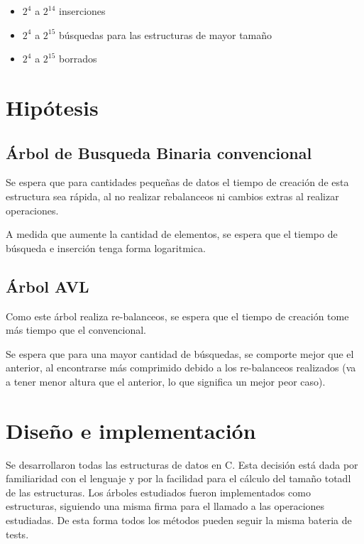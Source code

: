 \documentclass[12pt,letterpaper,hidelinks]{extarticle}
\begin{document}
	\begin{itemize}
			\item $2^{4}$ a $2^{14}$ inserciones
			\item $2^{4}$ a $2^{15}$ búsquedas para las estructuras de mayor tamaño
			\item $2^{4}$ a $2^{15}$ borrados
	\end{itemize}

\newpage
\section{Hipótesis}

	\subsection{Árbol de Busqueda Binaria convencional}
		Se espera que para cantidades pequeñas de datos el tiempo de creación de esta estructura
		sea rápida, al no realizar rebalanceos ni cambios extras al realizar operaciones.

		A medida que aumente la cantidad de elementos, se espera que el tiempo de búsqueda e inserción
		tenga forma logaritmica.

	\subsection{Árbol AVL}
		Como este árbol realiza re-balanceos, se espera que el tiempo de creación tome más tiempo que el
		convencional.

		Se espera que para una mayor cantidad de búsquedas, se comporte mejor que el anterior, al encontrarse más comprimido
		 debido a los re-balanceos realizados (va a tener menor altura que el anterior, lo que significa un mejor peor caso).




\section{Diseño e implementación}

Se desarrollaron todas las estructuras de datos en C. Esta decisión está dada por familiaridad con el lenguaje y por la facilidad para el cálculo del tamaño totadl de las estructuras.
Los árboles estudiados fueron implementados como estructuras, siguiendo una misma firma para el llamado a las operaciones estudiadas. De esta forma todos los métodos pueden seguir la misma bateria de tests.
\end{document}
